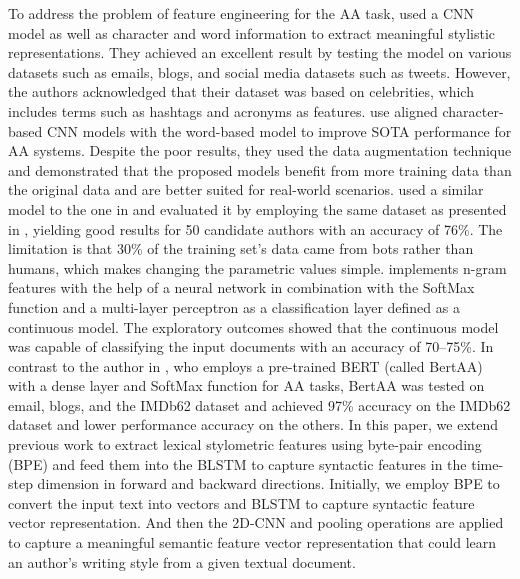 \documentclass[conference]{IEEEtran}
\begin{document}
To address the problem of feature engineering for the AA task, \cite{ruder2016character} used a CNN model as well as character and word information to extract meaningful stylistic representations. They achieved an excellent result by testing the model on various datasets such as emails, blogs, and social media datasets such as tweets. However, the authors acknowledged that their dataset was based on celebrities, which includes terms such as hashtags and acronyms as features. \cite{zhang2018syntax} use aligned character-based CNN models with the word-based model to improve SOTA performance for AA systems. Despite the poor results, they used the data augmentation technique and demonstrated that the proposed models benefit from more training data than the original data and are better suited for real-world scenarios.  \cite{shrestha2017convolutional} used a similar model to the one in \cite{ruder2016character} and evaluated it by employing the same dataset as presented in \cite{schwartz2013authorship}, yielding good results for 50 candidate authors with an accuracy of 76\%. The limitation is that 30\% of the training set's data came from bots rather than humans, which makes changing the parametric values simple. \cite{sari2017continuous} implements n-gram features with the help of a neural network in combination with the SoftMax function and a multi-layer perceptron as a classification layer defined as a continuous model. The exploratory outcomes showed that the continuous model was capable of classifying the input documents with an accuracy of 70–75\%. In contrast to the author in \cite{fabien2020bertaa}, who employs a pre-trained BERT (called BertAA) with a dense layer and SoftMax function for AA tasks, BertAA was tested on email, blogs, and the IMDb62 dataset and achieved 97\% accuracy on the IMDb62 dataset and lower performance accuracy on the others. In this paper, we extend previous work \cite{modupe2022post} to extract lexical stylometric features using byte-pair encoding (BPE) and feed them into the BLSTM to capture syntactic features in the time-step dimension in forward and backward directions. Initially, we employ BPE to convert the input text into vectors and BLSTM to capture syntactic feature vector representation. And then the 2D-CNN and pooling operations are applied to capture a meaningful semantic feature vector representation that could learn an author's writing style from a given textual document.
\end{document}
